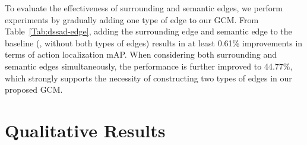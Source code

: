 \documentclass[10pt,journal,compsoc]{IEEEtran}
\def\hao{\textcolor{black}}
\begin{document}
	To evaluate the effectiveness of surrounding and semantic edges, we perform experiments by gradually adding one type of edge to our GCM.
	From Table~\ref{Tab:dssad-edge}, adding the surrounding edge and semantic edge to the baseline (\ie, without both types of edges) results in at least 0.61\% improvements in terms of action localization mAP. When considering both surrounding and semantic edges simultaneously, the performance is further improved to 44.77\%, which strongly supports the necessity of constructing two types of edges in our proposed GCM. 
	
	
	
	
	
	
	
	
	
	
	
	
	
	
	
	\section{Qualitative Results}
	
\end{document}
